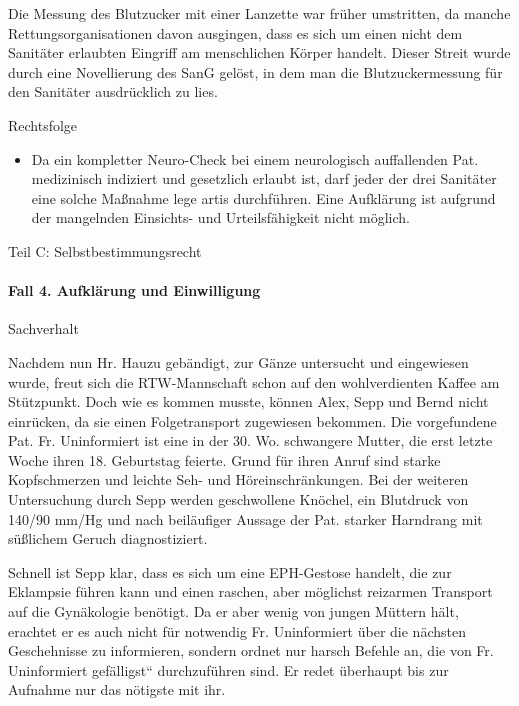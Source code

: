 \documentclass{article}
\begin{document}
Die Messung des Blutzucker mit einer Lanzette war fr\"uher umstritten,
da manche Rettungsorganisationen davon ausgingen, dass es sich um einen
nicht dem Sanit\"ater erlaubten Eingriff am menschlichen K\"orper
handelt. Dieser Streit wurde durch eine Novellierung des SanG gel\"ost,
in dem man die Blutzuckermessung f\"ur den Sanit\"ater ausdr\"ucklich
zu lies.

Rechtsfolge

\begin{itemize}
\item Da ein kompletter Neuro-Check bei einem neurologisch auffallenden
Pat. medizinisch indiziert und gesetzlich erlaubt ist, darf jeder der
drei Sanit\"ater eine solche Ma{\ss}nahme lege artis durchf\"uhren.
Eine Aufkl\"arung ist aufgrund der mangelnden Einsichts- und
Urteilsf\"ahigkeit nicht m\"oglich.

\end{itemize}
Teil C: Selbstbestimmungsrecht

\paragraph{Fall 4. Aufkl\"arung und Einwilligung}
Sachverhalt

Nachdem nun Hr. Hauzu geb\"andigt, zur G\"anze untersucht und
eingewiesen wurde, freut sich die RTW-Mannschaft schon auf den
wohlverdienten Kaffee am St\"utzpunkt. Doch wie es kommen musste,
k\"onnen Alex, Sepp und Bernd nicht einr\"ucken, da sie einen
Folgetransport zugewiesen bekommen. Die vorgefundene Pat. Fr.
Uninformiert ist eine in der 30. Wo. schwangere Mutter, die erst letzte
Woche ihren 18. Geburtstag feierte. Grund f\"ur ihren Anruf sind starke
Kopfschmerzen und leichte Seh- und H\"oreinschr\"ankungen. Bei der
weiteren Untersuchung durch Sepp werden geschwollene Kn\"ochel, ein
Blutdruck von 140/90 mm/Hg und nach beil\"aufiger Aussage der Pat.
starker Harndrang mit s\"u{\ss}lichem Geruch diagnostiziert.

Schnell ist Sepp klar, dass es sich um eine EPH-Gestose handelt, die zur
Eklampsie f\"uhren kann und einen raschen, aber m\"oglichst reizarmen
Transport auf die Gyn\"akologie ben\"otigt. Da er aber wenig von jungen
M\"uttern h\"alt, erachtet er es auch nicht f\"ur notwendig Fr.
Uninformiert \"uber die n\"achsten Geschehnisse zu informieren, sondern
ordnet nur harsch Befehle an, die von Fr. Uninformiert
{\quotedblbase}gef\"alligst{\textquotedblleft} durchzuf\"uhren sind. Er
redet \"uberhaupt bis zur Aufnahme nur das n\"otigste mit ihr.
\end{document}
